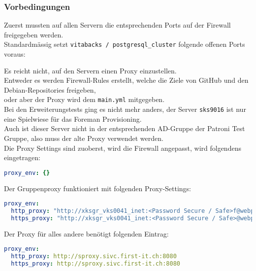 \begin{flushleft}
    \subsubsection{Vorbedingungen}
    Zuerst mussten auf allen Servern die entsprechenden Ports auf der Firewall freigegeben werden.\\
    Standardmässig setzt \texttt{vitabacks / postgresql\_cluster} folgende offenen Ports voraus:
    
\end{flushleft}
\begin{flushleft}
    Es reicht nicht, auf den Servern einen Proxy einzustellen.\\
    Entweder es werden Firewall-Rules erstellt, welche die Ziele von \Gls{GitHub} und den \Gls{Debian}-Repositories freigeben,\\
    oder aber der Proxy wird dem \texttt{main.yml} mitgegeben.\\
    Bei den Erweiterungstests ging es nicht mehr anders, der Server \texttt{sks9016} ist nur eine Spielwiese für das \Gls{Foreman} Provisioning.\\
    Auch ist dieser Server nicht in der entsprechenden AD-Gruppe der Patroni Test Gruppe, also muss der alte Proxy verwendet werden.\\
    Die Proxy Settings sind zuoberst, wird die Firewall angepasst, wird folgendens eingetragen:
    \lstset{style=gra_codestyle}
    \begin{lstlisting}[language=yaml, caption=main.xyml - No Proxy,captionpos=b,label={lst:main.yml-no-proxy},breaklines=true]
proxy_env: {}
    \end{lstlisting}
    Der Gruppenproxy funktioniert mit folgenden Proxy-Settings:
    \lstset{style=gra_codestyle}
    \begin{lstlisting}[language=yaml, caption=main.xyml - Gruppenproxy,captionpos=b,label={lst:main.yml-webproxy},breaklines=true]
proxy_env:
  http_proxy: "http://xksgr_vks0041_inet:<Password Secure / Safe>f@webproxy.sivc.first-it.ch:9090"
  https_proxy: "http://xksgr_vks0041_inet:<Password Secure / Safe>@webproxy.sivc.first-it.ch:9090"
    \end{lstlisting}
    Der Proxy für alles andere benötigt folgenden Eintrag:
    \lstset{style=gra_codestyle}
    \begin{lstlisting}[language=yaml, caption=main.xyml - SProxy,captionpos=b,label={lst:main.yml-sproxy},breaklines=true]
proxy_env:
  http_proxy: http://sproxy.sivc.first-it.ch:8080
  https_proxy: http://sproxy.sivc.first-it.ch:8080
    \end{lstlisting}
\end{flushleft}
